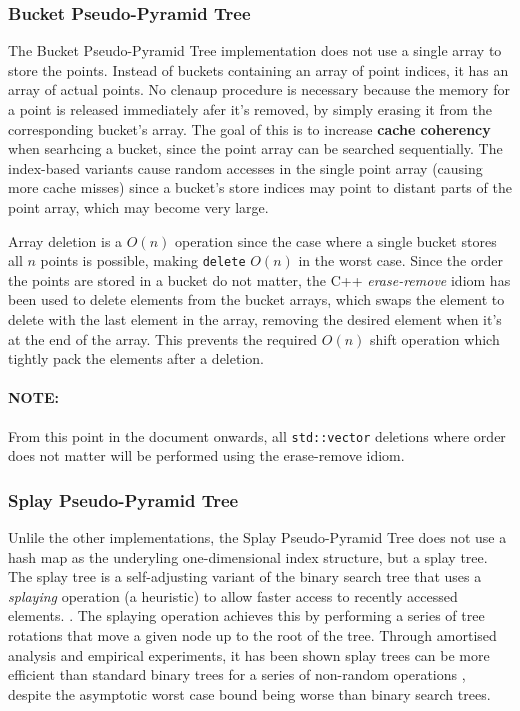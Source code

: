 \subsubsection{Bucket Pseudo-Pyramid Tree}

The Bucket Pseudo-Pyramid Tree implementation does not use a single array to store the points. Instead of buckets containing an array of point indices, it has an array of actual points. No clenaup procedure is necessary because the memory for a point is released immediately afer it's removed, by simply erasing it from the corresponding bucket's array. The goal of this is to increase \textbf{cache coherency} when searhcing a bucket, since the point array can be searched sequentially. The index-based variants cause random accesses in the single point array (causing more cache misses) since a bucket's store indices may point to distant parts of the point array, which may become very large.


Array deletion is a $O(n)$ operation since the case where a single bucket stores all $n$ points is possible, making \texttt{delete} $O(n)$ in the worst case. Since the order the points are stored in a bucket do not matter, the C++ \textit{erase-remove} idiom has been used to delete elements from the bucket arrays, which swaps the element to delete with the last element in the array, removing the desired element when it's at the end of the array. This prevents the required $O(n)$ shift operation which tightly pack the elements after a deletion.

\paragraph{\textbf{NOTE: }} From this point in the document onwards, all \texttt{std::vector} deletions where order does not matter will be performed using the erase-remove idiom.

\subsubsection{Splay Pseudo-Pyramid Tree}

Unlile the other implementations, the Splay Pseudo-Pyramid Tree does not use a hash map as the underyling one-dimensional index structure, but a splay tree. The splay tree is a self-adjusting variant of the binary search tree that uses a \textit{splaying} operation (a heuristic) to allow faster access to recently accessed elements. \cite{splay-tree}. The splaying operation achieves this by performing a series of tree rotations that move a given node up to the root of the tree. Through amortised analysis and empirical experiments, it has been shown splay trees can be more efficient than standard binary trees for a series of non-random operations \cite{splay-tree}, despite the asymptotic worst case bound being worse than binary search trees.

